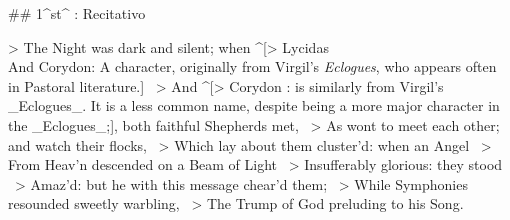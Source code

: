 ## 1^st^ \mvmt: Recitativo


> The Night was dark and silent; when ^[> Lycidas \\ And Corydon: A character, originally from Virgil's \textit{Eclogues}, who appears often in Pastoral literature.] \
> And ^[> Corydon : is similarly from Virgil's _Eclogues_. It is a less common name, despite being a more major character in the _Eclogues_;], both faithful Shepherds met,  \
> As wont to meet each other; and watch their flocks,  \
> Which lay about them cluster’d: when an Angel  \
> From Heav’n descended on a Beam of Light  \
> Insufferably glorious: they stood  \
> Amaz’d: but he with this message chear’d them;  \
> While Symphonies resounded sweetly warbling,  \
> The Trump of God preluding to his Song.

